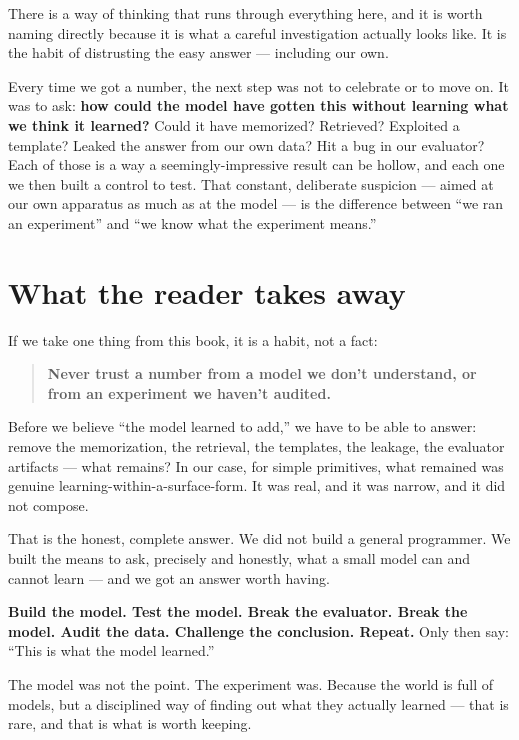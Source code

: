 There is a way of thinking that runs through everything here, and it is
worth naming directly because it is what a careful investigation
actually looks like. It is the habit of distrusting the easy answer ---
including our own.

Every time we got a number, the next step was not to celebrate or to
move on. It was to ask: \textbf{how could the model have gotten this
without learning what we think it learned?} Could it have memorized?
Retrieved? Exploited a template? Leaked the answer from our own data?
Hit a bug in our evaluator? Each of those is a way a
seemingly-impressive result can be hollow, and each one we then built a
control to test. That constant, deliberate suspicion --- aimed at our
own apparatus as much as at the model --- is the difference between ``we
ran an experiment'' and ``we know what the experiment means.''

\section{What the reader takes away}\label{what-the-reader-takes-away}

If we take one thing from this book, it is a habit, not a fact:

\begin{quote}
\textbf{Never trust a number from a model we don't understand, or from
an experiment we haven't audited.}
\end{quote}

Before we believe ``the model learned to add,'' we have to be able to
answer: remove the memorization, the retrieval, the templates, the
leakage, the evaluator artifacts --- what remains? In our case, for
simple primitives, what remained was genuine
learning-within-a-surface-form. It was real, and it was narrow, and it
did not compose.

That is the honest, complete answer. We did not build a general
programmer. We built the means to ask, precisely and honestly, what a
small model can and cannot learn --- and we got an answer worth having.

\textbf{Build the model. Test the model. Break the evaluator. Break the
model. Audit the data. Challenge the conclusion. Repeat.} Only then say:
``This is what the model learned.''

The model was not the point. The experiment was. Because the world is
full of models, but a disciplined way of finding out what they actually
learned --- that is rare, and that is what is worth keeping.

